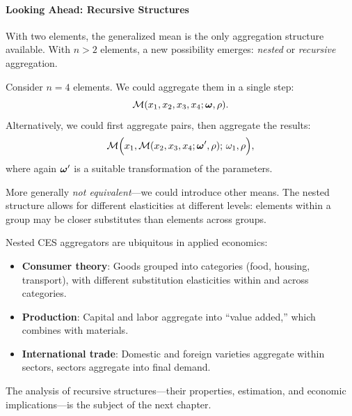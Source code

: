 \paragraph{Looking Ahead: Recursive Structures}

With two elements, the generalized mean is the only aggregation structure available. With $n > 2$ elements, a new possibility emerges: \emph{nested} or \emph{recursive} aggregation.

Consider $n = 4$ elements. We could aggregate them in a single step:
\begin{equation}
\mathcal{M}(x_1, x_2, x_3, x_4; \boldsymbol{\omega}, \rho).
\end{equation}
Alternatively, we could first aggregate pairs, then aggregate the results:
\begin{equation}
\mathcal{M}\Big(x_1 , \mathcal{M}( x_2,x_3, x_4; \boldsymbol{\omega}', \rho); \, \omega_1, \rho \Big),
\end{equation}
where again $\boldsymbol{\omega}'$ is a suitable transformation of the parameters. 

More generally \emph{not equivalent}---we could introduce other means. The nested structure allows for different elasticities at different levels: elements within a group may be closer substitutes than elements across groups.

\begin{calloutimportant}
Nested CES aggregators are ubiquitous in applied economics:
\begin{itemize}[leftmargin=1.5em]
    \item \textbf{Consumer theory}: Goods grouped into categories (food, housing, transport), with different substitution elasticities within and across categories.
    \item \textbf{Production}: Capital and labor aggregate into ``value added,'' which combines with materials.
    \item \textbf{International trade}: Domestic and foreign varieties aggregate within sectors, sectors aggregate into final demand.
\end{itemize}
The analysis of recursive structures---their properties, estimation, and economic implications---is the subject of the next chapter.
\end{calloutimportant}